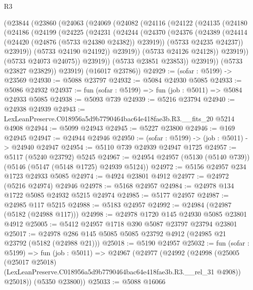 \begin{lexlean}{R3}
\begin{coremodule}
      (@23844
        (@23860
          (@24063
            (@24069
              (@24082
                (@24116
                  (@24122
                    (@24135
                      (@24180
                        (@24186
                          (@24199
                            (@24225
                              (@24231
                                (@24244
                                  (@24370
                                    (@24376
                                      (@24389
                                        (@24414 (@24420 (@24876 (@5733 @24380 @24382)) @23919))
                                        (@5733 @24235 @24237))
                                      @23919))
                                  (@5733 @24190 @24192))
                                @23919))
                            (@5733 @24126 @24128))
                          @23919))
                      (@5733 @24073 @24075))
                    @23919))
                (@5733 @23851 @23853))
              @23919))
          (@5733 @23827 @23829))
        @23919)
      (@16017 @23786))
@24929 := (sofar : @5199) -> @23569
@24930 := @5088 @23797
@24932 := @5084 @24930 @5085
@24933 := @5086 @24932
@24937 := fun (sofar : @5199) => fun (job : @5011) => @5084 @24933 @5085
@24938 := @5093 @739
@24939 := @5216 @23794
@24940 := @24938 @24939
@24943 := LexLeanPreserve.C018956a5d9b7790464bac64e418fae3b.R3.__fits_20 @5214 @4908
@24944 := @5099 @24943
@24945 := @5227 @23800
@24946 := @169 @24945
@24947 := @24944 @24946
@24950 := (sofar : @5199) -> (job : @5011) -> @24940 @24947
@24954 := @5110 @739 @24939 @24947 @1725
@24957 := @5117 (@5240 @23792) @5245
@24967 := @24954 @24957 (@5130 (@5140 @739)) (@5146 (@5147 (@5148 @1725) @24939 @5124))
@24972 := @5156 @24957 @234 @1723 @24933 @5085
@24974 := @4924 @23801 @4912
@24977 := @24972 (@5216 @24974) @24946
@24978 := @5168 @24957
@24984 := @24978 @134 @1722 @5085 @24932 @5215 @24974
@24985 := @5177 @24957
@24987 := @24985 @117 @5215
@24988 := @5183 @24957
@24992 := @24984 (@24987 (@5182 (@24988 @117)))
@24998 := @24978 @1720 @145 @24930 @5085 @23801 @4912
@25005 := @5412 @24957 @1718 @390 @5087 @23797 @23794 @23801
@25017 := @24978 @286 @145 @5085 @5085 @23792 @4912 (@24985 @21 @23792 (@5182 (@24988 @21)))
@25018 := @5190 @24957
@25032 := fun (sofar : @5199) =>
  fun (job : @5011) =>
  @24967
    (@24977
      (@24992
        (@24998
          (@25005
            (@25017 @25018)
            (LexLeanPreserve.C018956a5d9b7790464bac64e418fae3b.R3.__rel_31 @4908))
          @25018))
      (@5350 @23800))
@25033 := @5088 @16066

\end{coremodule}
\end{lexlean}
